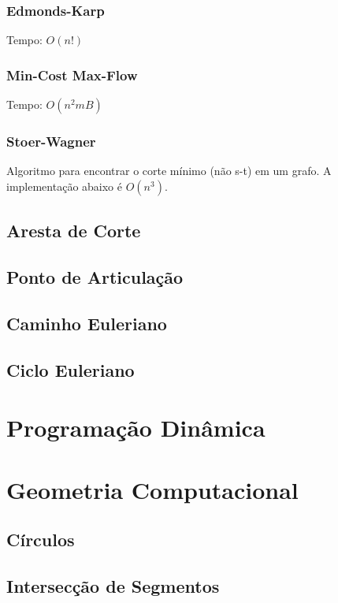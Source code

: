 \documentclass[12pt,a4paper]{article}
\begin{document}
			\subsubsection{Edmonds-Karp}
				Tempo: \( O(n!) \) %
				
			\subsubsection{Min-Cost Max-Flow}
				Tempo: \( O(n^2 m B) \)
				
			\subsubsection{Stoer-Wagner}
				Algoritmo para encontrar o corte mínimo (não s-t) em um grafo. A implementação abaixo é \(O(n^3)\).
				
		\subsection{Aresta de Corte}
			
		\subsection{Ponto de Articulação}
			
		\subsection{Caminho Euleriano}
		\subsection{Ciclo Euleriano}

	\section{Programação Dinâmica}
	
	\section{Geometria Computacional}
		
		\subsection{Círculos}
			
		\subsection{Intersecção de Segmentos}
			
\end{document}
